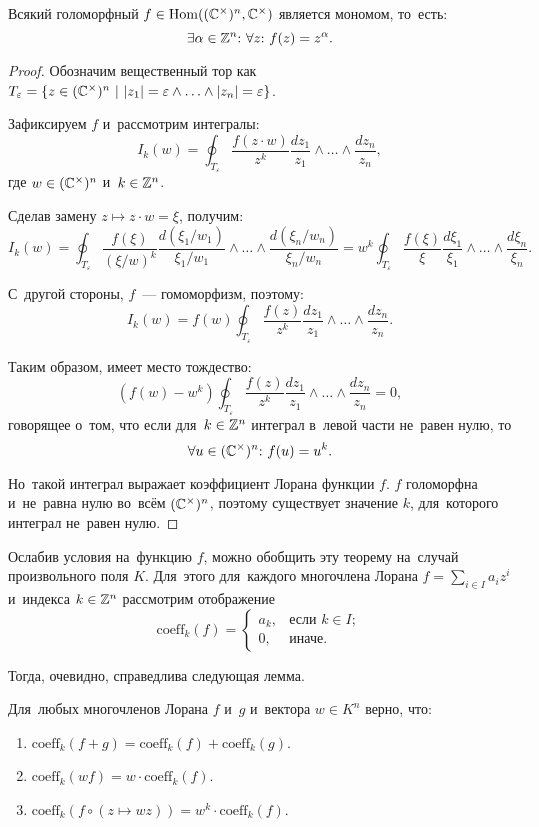 \documentclass{article}
\begin{document}
\begin{lemma*}
    Всякий голоморфный $f \in \mathrm{Hom}((\mathbb{C}^\times)^n, \mathbb{C}^\times)$ является мономом, то~есть:
    $$
        \exists \alpha \in \mathbb{Z}^n{:}\ \forall z{:}\ f(z) = z^\alpha.
    $$
\end{lemma*}

\begin{proof}

Обозначим вещественный тор как $T_\varepsilon = \{ z \in (\mathbb{C}^\times)^n\ |\ |z_1| = \varepsilon \wedge \ldots \wedge |z_n| = \varepsilon \}$.

Зафиксируем $f$ и~рассмотрим интегралы:
$$
    I_k(w) = \oint_{T_\varepsilon} \frac{f(z \cdot w)}{z^k} \frac{dz_1}{z_1} \wedge \ldots \wedge \frac{dz_n}{z_n},
$$
где $w \in (\mathbb{C}^\times)^n$ и~$k \in \mathbb{Z}^n$.

Сделав замену $z \mapsto z \cdot w = \xi$, получим:
$$
    I_k(w) = \oint_{T_\varepsilon} \frac{f(\xi)}{(\xi / w)^k} \frac{d(\xi_1 / w_1)}{\xi_1 / w_1} \wedge \ldots \wedge \frac{d(\xi_n / w_n)}{\xi_n / w_n}
           = w^k \oint_{T_\varepsilon} \frac{f(\xi)}{\xi} \frac{d\xi_1}{\xi_1} \wedge \ldots \wedge \frac{d\xi_n}{\xi_n}.
$$

С~другой стороны, $f$~— гомоморфизм, поэтому:
$$
    I_k(w) = f(w) \oint_{T_\varepsilon} \frac{f(z)}{z^k} \frac{dz_1}{z_1} \wedge \ldots \wedge \frac{dz_n}{z_n}.
$$

Таким образом, имеет место тождество:
$$
    (f(w) - w^k) \oint_{T_\varepsilon} \frac{f(z)}{z^k} \frac{dz_1}{z_1} \wedge \ldots \wedge \frac{dz_n}{z_n} = 0,
$$
говорящее о~том, что если для~$k \in \mathbb{Z}^n$ интеграл в~левой части не~равен нулю, то
$$
    \forall u \in (\mathbb{C}^\times)^n{:}\ f(u) = u^k.
$$

Но~такой интеграл выражает коэффициент Лорана функции $f$. $f$ голоморфна и~не~равна нулю
во~всём $(\mathbb{C}^\times)^n$, поэтому существует значение $k$, для~которого интеграл не~равен нулю.

\end{proof}

Ослабив условия на~функцию $f$, можно обобщить эту теорему на~случай произвольного поля $K$.
Для~этого для~каждого многочлена Лорана $f = \sum_{i \in I} a_i z^i$ и~индекса $k \in \mathbb{Z}^n$ рассмотрим отображение
$$
    \mathrm{coeff}_k(f) =
    \begin{cases}
        a_k, & \text{если $k \in I$}; \\
        0,   & \text{иначе.}
    \end{cases}
$$

Тогда, очевидно, справедлива следующая лемма.
\begin{lemma*}
    Для~любых многочленов Лорана $f$ и~$g$ и~вектора $w \in K^n$ верно, что:
    \begin{enumerate}
        \item $\mathrm{coeff}_k(f + g) = \mathrm{coeff}_k(f) + \mathrm{coeff}_k(g)$.
        \item $\mathrm{coeff}_k(w f) = w \cdot \mathrm{coeff}_k(f)$.
        \item $\mathrm{coeff}_k(f \circ (z \mapsto wz)) = w^k \cdot \mathrm{coeff}_k(f)$.
    \end{enumerate}
\end{lemma*}
\end{document}
